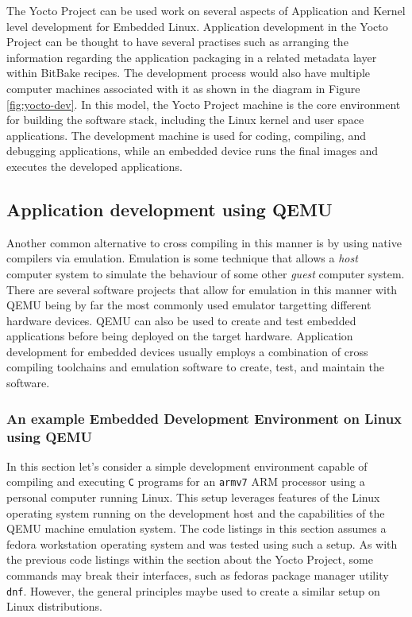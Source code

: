 The Yocto Project can be used work on several aspects of Application and Kernel level development for Embedded Linux. Application development in the Yocto Project can be thought to have several practises such as arranging the information regarding the application packaging in a related metadata layer within BitBake recipes. The development process would also have multiple computer machines associated with it as shown in the diagram in Figure \ref{fig:yocto-dev}. In this model, the Yocto Project machine is the core environment for building the software stack, including the Linux kernel and user space applications. The development machine is used for coding, compiling, and debugging applications, while an embedded device runs the final images and executes the developed applications.

\subsection{Application development using QEMU}

Another common alternative to cross compiling in this manner is by using native compilers via emulation. Emulation is some technique that allows a \textit{host} computer system to simulate the behaviour of some other \textit{guest} computer system. There are several software projects that allow for emulation in this manner with QEMU being by far the most commonly used emulator targetting different hardware devices. QEMU can also be used to create and test embedded applications before being deployed on the target hardware. Application development for embedded devices usually employs a combination of cross compiling toolchains and emulation software to create, test, and maintain the software.

\subsubsection{An example Embedded Development Environment on Linux using QEMU}

In this section let's consider a simple development environment capable of compiling and executing \texttt{C} programs for an \texttt{armv7} ARM processor using a personal computer running Linux. This setup leverages features of the Linux operating system running on the development host and the capabilities of the QEMU machine emulation system. The code listings in this section assumes a fedora workstation operating system and was tested using such a setup. As with the previous code listings within the section about the Yocto Project, some commands may break their interfaces, such as fedora\textquotesingle s package manager utility \texttt{dnf}. However, the general principles maybe used to create a similar setup on Linux distributions.

